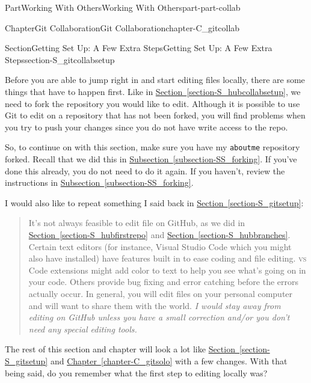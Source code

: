\documentclass[oneside,10pt,]{book}
\newcommand{\xreffont}{\relax}
\newcommand{\mono}[1]{\texttt{#1}}
\newcommand{\initialism}[1]{\textsc{\MakeLowercase{#1}}}
\begin{document}
\begin{partptx}{Part}{Working With Others}{}{Working With Others}{}{}{part-part-collab}
\begin{chapterptx}{Chapter}{Git Collaboration}{}{Git Collaboration}{}{}{chapter-C_gitcollab}
\begin{introduction}{}
\end{introduction}%
%
%
\typeout{************************************************}
\typeout{************************************************}
%
\begin{sectionptx}{Section}{Getting Set Up: A Few Extra Steps}{}{Getting Set Up: A Few Extra Steps}{}{}{section-S_gitcollabsetup}
%
\begin{introduction}{}%
Before you are able to jump right in and start editing files locally, there are some things that have to happen first. Like in \hyperref[section-S_hubcollabsetup]{Section~{\xreffont\ref{section-S_hubcollabsetup}}}, we need to fork the repository you would like to edit. Although it is possible to use Git to edit on a repository that has not been forked, you will find problems when you try to push your changes since you do not have write access to the repo.%
\par
So, to continue on with this section, make sure you have my \mono{aboutme} repository forked. Recall that we did this in \hyperref[subsection-SS_forking]{Subsection~{\xreffont\ref{subsection-SS_forking}}}. If you've done this already, you do not need to do it again. If you haven't, review the instructions in \hyperref[subsection-SS_forking]{Subsection~{\xreffont\ref{subsection-SS_forking}}}.%
\par
I would also like to repeat something I said back in \hyperref[section-S_gitsetup]{Section~{\xreffont\ref{section-S_gitsetup}}}:%
\begin{quote}%
It's not always feasible to edit file on GitHub, as we did in \hyperref[section-S_hubfirstrepo]{Section~{\xreffont\ref{section-S_hubfirstrepo}}} and \hyperref[section-S_hubbranches]{Section~{\xreffont\ref{section-S_hubbranches}}}. Certain text editors (for instance, Visual Studio Code which you might also have installed) have features built in to ease coding and file editing. \initialism{VS} Code extensions might add color to text to help you see what's going on in your code. Others provide bug fixing and error catching before the errors actually occur. In general, you will edit files on your personal computer and will want to share them with the world. \emph{I would stay away from editing on GitHub unless you have a small correction and\slash{}or you don't need any special editing tools.}%
\end{quote}
The rest of this section and chapter will look a lot like \hyperref[section-S_gitsetup]{Section~{\xreffont\ref{section-S_gitsetup}}} and \hyperref[chapter-C_gitsolo]{Chapter~{\xreffont\ref{chapter-C_gitsolo}}} with a few changes. With that being said, do you remember what the first step to editing locally was?%

\end{introduction}
\end{sectionptx}
\end{chapterptx}
\end{partptx}
\end{document}
